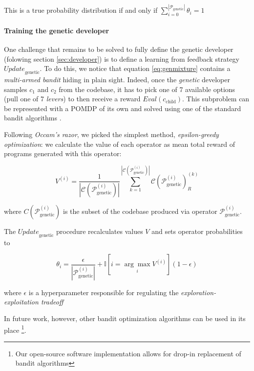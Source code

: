 This is a true probability distribution if and only if $\sum\limits_{i=0}^{|\mathcal{P}_\text{genetic}|} 
    \theta_i = 1$


\paragraph{Training the genetic developer}

One challenge that remains to be solved to fully define the genetic developer (folowing section \ref{sec:developer}) is to define a learning from feedback strategy $\mathit{Update}_\text{genetic}$.
To do this, we notice that equation \ref{eq:genmixture} contains a \emph{multi-armed bandit} \cite{banditproblem} hiding in plain sight.
Indeed, once the \emph{genetic} developer samples $c_1$ and $c_2$ from the codebase, it has to pick one of 7 available options (pull one of 7 \emph{levers}) to then receive a reward $\mathit{Eval}(c_\text{child})$.
This subproblem can be represented with a POMDP of its own and solved using one of the standard bandit algorithms \cite{banditsolutions}.

Following \emph{Occam's razor}, we picked the simplest method, \emph{epsilon-greedy optimization}: we calculate the value of each operator as mean total reward of programs generated with this operator:

\begin{equation}
    V^{(i)} = \frac{1}{|\mathcal{C}(\mathcal{P}_\text{genetic}^{(i)})|} 
    \sum\limits_{k=1}^{|\mathcal{C}(\mathcal{P}_\text{genetic}^{(i)})|}
    \mathcal{C}(\mathcal{P}_\text{genetic}^{(i)})_R^{(k)} 
\end{equation}

where $C(\mathcal{P}_\text{genetic}^{(i)})$ is the subset of the codebase produced via operator $\mathcal{P}_\text{genetic}^{(i)}$.

The $\mathit{Update}_\text{genetic}$ procedure recalculates values $V$ and sets operator probabilities to

\begin{equation}
    \theta_i = \frac{\epsilon}{|\mathcal{P}_\text{genetic}^{(i)}|} +
    \mathbb{I}[i = \underset{i}{\arg\max} V^{(i)}] (1 - \epsilon)
\end{equation}

where $\epsilon$ is a hyperparameter responsible for regulating the \emph{exploration-exploitation tradeoff} \cite{banditsexplo}

In future work, however, other bandit optimization algorithms can be used in its place \footnote{Our open-source software implementation allows for drop-in replacement of bandit algorithms}.

